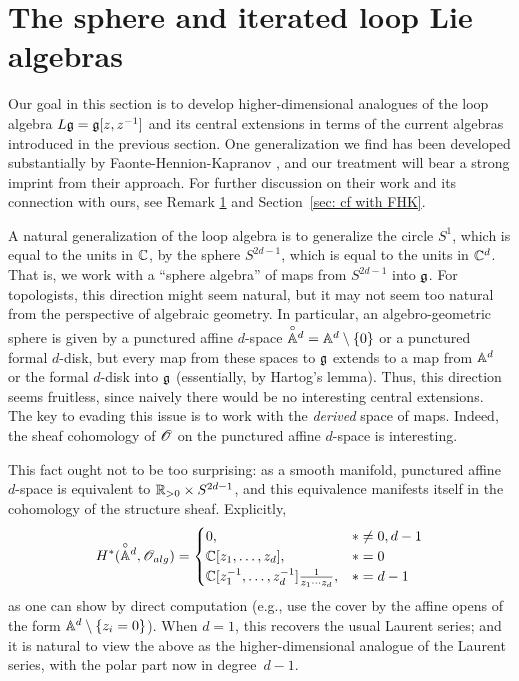 \section{The sphere and iterated loop Lie algebras}

Our goal in this section is to develop higher-dimensional analogues of the loop algebra $L\fg = \fg[z,z^{-1}]$ and its central extensions in terms of the current algebras introduced in the previous section.
One generalization we find has been developed substantially by Faonte-Hennion-Kapranov \cite{FHK},
and our treatment will bear a strong imprint from their approach.
For further discussion on their work and its connection with ours,
see Remark \ref{} and Section~\ref{sec: cf with FHK}.

A natural generalization of the loop algebra is to generalize the circle $S^1$, which is equal to the units in $\CC$, by the sphere $S^{2d-1}$, which is equal to the units in $\CC^d$.
That is, we work with a ``sphere algebra'' of maps from $S^{2d-1}$ into $\fg$.
For topologists, this direction might seem natural,
but it may not seem too natural from the perspective of algebraic geometry.
In particular, an algebro-geometric sphere is given by a punctured affine $d$-space $\dAA^d = \AA^d \setminus \{0\}$ or a punctured formal $d$-disk,
but every map from these spaces to $\fg$ extends to a map from $\AA^d$ or the formal $d$-disk into $\fg$ (essentially, by Hartog's lemma).
Thus, this direction seems fruitless, since naively there would be no interesting central extensions.
The key to evading this issue is to work with the {\em derived} space of maps. 
Indeed, the sheaf cohomology of $\sO$ on the punctured affine $d$-space is interesting. 

This fact ought not to be too surprising: 
as a smooth manifold, punctured affine $d$-space is equivalent to $\RR_{> 0} \times S^{2d-1}$,
and this equivalence manifests itself in the cohomology of the structure sheaf.
Explicitly,
\[
H^*(\dAA^d, \sO_{alg}) = 
\begin{cases} 0, & * \neq 0, d-1 \\ \CC[z_1,\ldots,z_d], & * = 0 \\ \CC[z_1^{-1},\ldots,z_d^{-1}] \frac{1}{z_1 \cdots z_d}, & * = d-1 \end{cases}
\]
as one can show by direct computation (e.g., use the cover by the affine opens of the form $\AA^d \setminus \{z_i =0\}$).
When $d = 1$, this recovers the usual Laurent series;
and it is natural to view the above as the higher-dimensional analogue of the Laurent series,
with the polar part now in degree~$d-1$.

